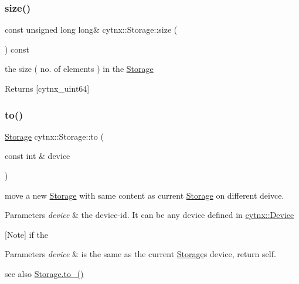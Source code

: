 \subsubsection{\texorpdfstring{size()}{size()}}
{\footnotesize\ttfamily const unsigned long long\& cytnx\+::\+Storage\+::size (\begin{DoxyParamCaption}{ }\end{DoxyParamCaption}) const\hspace{0.3cm}{\ttfamily [inline]}}



the size ( no. of elements ) in the \hyperlink{classcytnx_1_1Storage}{Storage} 

\begin{DoxyReturn}{Returns}
\mbox{[}cytnx\+\_\+uint64\mbox{]} 
\end{DoxyReturn}
\mbox{\label{classcytnx_1_1Storage_a2abfcaacf807934be5dd21c254fdb30e}} 
\subsubsection{\texorpdfstring{to()}{to()}}
{\footnotesize\ttfamily \hyperlink{classcytnx_1_1Storage}{Storage} cytnx\+::\+Storage\+::to (\begin{DoxyParamCaption}\item[{const int \&}]{device }\end{DoxyParamCaption})\hspace{0.3cm}{\ttfamily [inline]}}



move a new \hyperlink{classcytnx_1_1Storage}{Storage} with same content as current \hyperlink{classcytnx_1_1Storage}{Storage} on different deivce. 


\begin{DoxyParams}{Parameters}
{\em device} & the device-\/id. It can be any device defined in \hyperlink{}{cytnx\+::\+Device }\\
\hline
\end{DoxyParams}
\mbox{[}Note\mbox{]} if the 
\begin{DoxyParams}{Parameters}
{\em device} & is the same as the current \hyperlink{classcytnx_1_1Storage}{Storage}\textquotesingle{}s device, return self.\\
\hline
\end{DoxyParams}
see also \hyperlink{classcytnx_1_1Storage_a0bbf2cbefb5d0835bcb4f0d05e400870}{Storage.\+to\+\_\+() } \mbox{\label{classcytnx_1_1Storage_a0bbf2cbefb5d0835bcb4f0d05e400870}} 
